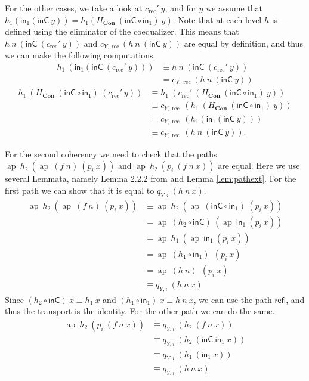 \documentclass[a4paper,UKenglish]{lipics-v2016}
\newcommand{\Boperator}[1]{\mathsf{#1}}
\newcommand{\inn}{\Boperator{in}}
\newcommand{\rec}[0]{\operatorname{rec}}
\newcommand{\ap}[0]{\operatorname{ap}}
\newcommand{\Con}[0]{\textbf{Con}}
\newcommand{\refl}[0]{\Boperator{refl}}
\newcommand{\inC}[0]{\Boperator{inC}}
\begin{document}
For the other cases, we take a look at $c_{\rec}' \> y$, and for $y$ we assume that $h_1(\inn_1(\inC \> y)) = h_1(H_{\Con} \> (\inC \circ \inn_1) \> y)$.
Note that at each level $h$ is defined using the eliminator of the coequalizer.
This means that $h \> n \> (\inC \> (c_{\rec}' \> y))$ and $c_{Y, \rec}(h \> n \> (\inC \> y))$ are equal by definition, and thus we can make the following computations.
\begin{equation*}
\begin{split}
h_1 \> (\inn_1(\inC \> (c_{\rec}' \> y))) 
&\equiv 
h \> n \> (\inC \> (c_{\rec}' \> y))\\
&
= c_{Y, \rec} (h \> n \> (\inC \> y))
\end{split}
\end{equation*}
\begin{equation*}
\begin{split}
h_1 \> (H_{\Con} \> (\inC \circ \inn_1) \> (c_{\rec}' \> y)) 
&\equiv 
h_1 \> (c_{\rec}' \> (H_{\Con} \> (\inC \circ \inn_1) \> y))
\\
&\equiv
c_{Y, \rec} \> (h_1 \> (H_{\Con} \> (\inC \circ \inn_1) \> y))\\
&=
c_{Y, \rec} \> (h_1(\inn_1(\inC \> y)))\\
&\equiv
c_{Y, \rec} \> (h \> n \> (\inC \> y)).
\end{split}
\end{equation*}


For the second coherency we need to check that the paths $\ap \> h_2 \> (\ap \> (f \> n) \> (p_i \> x))$ and $\ap \> h_2 \> (p_i \> (f \> n \> x))$ are equal.
Here we use several Lemmata, namely Lemma 2.2.2 from \cite{hottbook} and Lemma \ref{lem:pathext}.
For the first path we can show that it is equal to $q_{Y, i} \> (h \> n \> x)$.
\begin{equation*}
\begin{split}
\ap \> h_2 \> (\ap \> (f \> n) \> (p_i \> x))
&\equiv
\ap \> h_2 \> (\ap \> (\inC \circ \inn_1) \> (p_i \> x))\\
&=
\ap \> (h_2 \circ \inC) \> (\ap \> \inn_1 \> (p_i \> x))\\
&=
\ap \> h_1 \> (\ap \> \inn_1 \> (p_i \> x))\\
&=
\ap \> (h_1 \circ \inn_1) \> \> (p_i \> x)\\
&=
\ap \> (h \> n) \> \> (p_i \> x)\\
&\equiv
q_{Y, i} \> (h \> n \> x)
\end{split}
\end{equation*}
Since $(h_2 \circ \inC) \> x \equiv h_1 \> x$ and $(h_1 \circ \inn_1) \> x \equiv h \> n \> x$, we can use the path $\refl$, and thus the transport is the identity.
For the other path we can do the same.
\begin{equation*}
\begin{split}
\ap \> h_2 \> (p_i \> (f \> n \> x))
&\equiv
q_{Y, i} \> (h_2 \> (f \> n \> x))\\
&\equiv
q_{Y, i} \> (h_2 \> (\inC \> \inn_1 \> x))\\
&\equiv
q_{Y, i} \> (h_1 \> (\inn_1 \> x))\\
&\equiv
q_{Y, i} \> (h \> n \> x)
\end{split}
\end{equation*}
\end{document}
